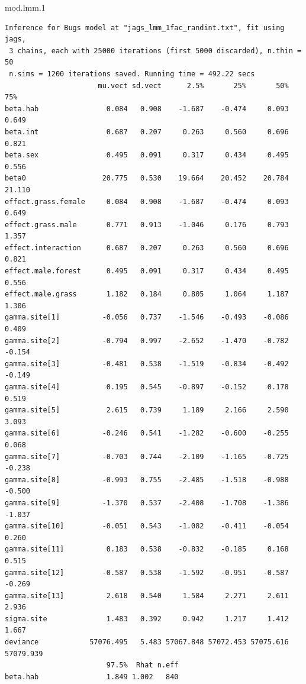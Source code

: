 \documentclass[
  13,
  letterpaper,
]{report}
\newenvironment{Shaded}{\begin{snugshade}}{\end{snugshade}}
\newcommand{\FloatTok}[1]{\textcolor[rgb]{0.68,0.00,0.00}{#1}}
\newcommand{\NormalTok}[1]{\textcolor[rgb]{0.00,0.23,0.31}{#1}}
\begin{document}
\begin{Shaded}
\begin{Highlighting}[]
\NormalTok{mod.lmm}\FloatTok{.1}
\end{Highlighting}
\end{Shaded}

\begin{verbatim}
Inference for Bugs model at "jags_lmm_1fac_randint.txt", fit using jags,
 3 chains, each with 25000 iterations (first 5000 discarded), n.thin = 50
 n.sims = 1200 iterations saved. Running time = 492.22 secs
                      mu.vect sd.vect      2.5%       25%       50%       75%
beta.hab                0.084   0.908    -1.687    -0.474     0.093     0.649
beta.int                0.687   0.207     0.263     0.560     0.696     0.821
beta.sex                0.495   0.091     0.317     0.434     0.495     0.556
beta0                  20.775   0.530    19.664    20.452    20.784    21.110
effect.grass.female     0.084   0.908    -1.687    -0.474     0.093     0.649
effect.grass.male       0.771   0.913    -1.046     0.176     0.793     1.357
effect.interaction      0.687   0.207     0.263     0.560     0.696     0.821
effect.male.forest      0.495   0.091     0.317     0.434     0.495     0.556
effect.male.grass       1.182   0.184     0.805     1.064     1.187     1.306
gamma.site[1]          -0.056   0.737    -1.546    -0.493    -0.086     0.409
gamma.site[2]          -0.794   0.997    -2.652    -1.470    -0.782    -0.154
gamma.site[3]          -0.481   0.538    -1.519    -0.834    -0.492    -0.149
gamma.site[4]           0.195   0.545    -0.897    -0.152     0.178     0.519
gamma.site[5]           2.615   0.739     1.189     2.166     2.590     3.093
gamma.site[6]          -0.246   0.541    -1.282    -0.600    -0.255     0.068
gamma.site[7]          -0.703   0.744    -2.109    -1.165    -0.725    -0.238
gamma.site[8]          -0.993   0.755    -2.485    -1.518    -0.988    -0.500
gamma.site[9]          -1.370   0.537    -2.408    -1.708    -1.386    -1.037
gamma.site[10]         -0.051   0.543    -1.082    -0.411    -0.054     0.260
gamma.site[11]          0.183   0.538    -0.832    -0.185     0.168     0.515
gamma.site[12]         -0.587   0.538    -1.592    -0.951    -0.587    -0.269
gamma.site[13]          2.618   0.540     1.584     2.271     2.611     2.936
sigma.site              1.483   0.392     0.942     1.217     1.412     1.667
deviance            57076.495   5.483 57067.848 57072.453 57075.616 57079.939
                        97.5%  Rhat n.eff
beta.hab                1.849 1.002   840

\end{verbatim}
\end{document}
